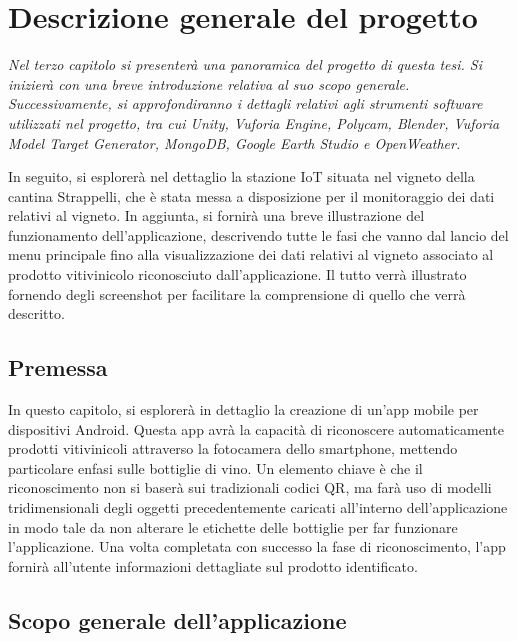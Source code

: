 \chapter{Descrizione generale del progetto}

\begin{preamble}
{\em 
Nel terzo capitolo si presenterà una panoramica del progetto di questa tesi. Si inizierà con una breve introduzione relativa al suo scopo generale. Successivamente, si approfondiranno i dettagli relativi agli strumenti software utilizzati nel progetto, tra cui Unity, Vuforia Engine, Polycam, Blender, Vuforia Model Target Generator, MongoDB, Google Earth Studio e OpenWeather.

In seguito, si esplorerà nel dettaglio la stazione IoT situata nel vigneto della cantina Strappelli, che è stata messa a disposizione per il monitoraggio dei dati relativi al vigneto. In aggiunta, si fornirà una breve illustrazione del funzionamento dell'applicazione, descrivendo tutte le fasi che vanno dal lancio del menu principale fino alla visualizzazione dei dati relativi al vigneto associato al prodotto vitivinicolo riconosciuto dall'applicazione. Il tutto verrà illustrato fornendo degli screenshot per facilitare la comprensione di quello che verrà descritto.
}
\end{preamble}

\section{Premessa}

In questo capitolo, si esplorerà in dettaglio la creazione di un'app mobile per dispositivi Android. Questa app avrà la capacità di riconoscere automaticamente prodotti vitivinicoli attraverso la fotocamera dello smartphone, mettendo particolare enfasi sulle bottiglie di vino. Un elemento chiave è che il riconoscimento non si baserà sui tradizionali codici QR, ma farà uso di modelli tridimensionali degli oggetti precedentemente caricati all'interno dell'applicazione in modo tale da non alterare le etichette delle bottiglie per far funzionare l'applicazione. Una volta completata con successo la fase di riconoscimento, l'app fornirà all'utente informazioni dettagliate sul prodotto identificato.

\section{Scopo generale dell'applicazione}

